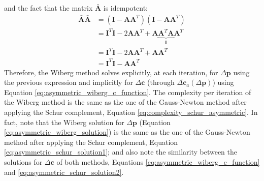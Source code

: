 and the fact that the matrix $\bar{\mathbf{A}}$ is idempotent:
 \begin{equation}
    \begin{aligned}
    	\bar{\mathbf{A}}\bar{\mathbf{A}} & = \left( \mathbf{I} - \mathbf{A}\mathbf{A}^T \right) \left( \mathbf{I} - \mathbf{A}\mathbf{A}^T \right)
    	\\
    	& = \mathbf{I}^T\mathbf{I} - 2\mathbf{A}\mathbf{A}^T + \mathbf{A}\underbrace{\mathbf{A}^T\mathbf{A}}_{\mathbf{I}}\mathbf{A}^T
    	\\
    	& = \mathbf{I}^T\mathbf{I} - 2\mathbf{A}\mathbf{A}^T + \mathbf{A}\mathbf{A}^T
    	\\
    	& = \mathbf{I}^T\mathbf{I} - \mathbf{A}\mathbf{A}^T 
    \label{eq:idempotent_bar_A}
    \end{aligned}
\end{equation}
Therefore, the Wiberg method solves explicitly, at each iteration,  for $\Delta\mathbf{p}$ using the previous expression and implicitly for $\Delta\mathbf{c}$ (through $\bar{\Delta \mathbf{c}}_a(\Delta \mathbf{p})$) using Equation \ref{eq:asymmetric_wiberg_c_function}. The complexity per iteration of the Wiberg method is the same as the one of the Gauss-Newton method after applying the Schur complement, Equation \ref{eq:complexity_schur_asymmetric}. In fact, note that the Wiberg solution for $\Delta\mathbf{p}$ (Equation \ref{eq:asymmetric_wiberg_solution}) is the same as the one of the Gauss-Newton method after applying the Schur complement, Equation \ref{eq:asymmetric_schur_solution1}; and also note the similarity between the solutions for $\Delta\mathbf{c}$ of both methods, Equations \ref{eq:asymmetric_wiberg_c_function} and \ref{eq:asymmetric_schur_solution2}.

